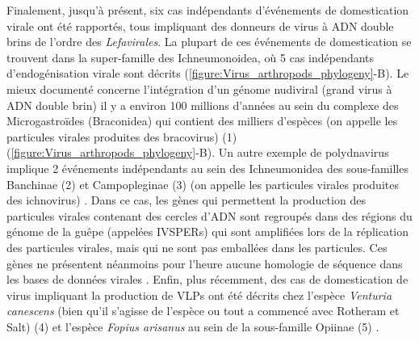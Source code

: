 Finalement, jusqu'à présent, six cas indépendants d'événements de domestication virale ont été rapportés, tous impliquant des donneurs de virus à ADN double brins de l'ordre des \textit{Lefavirales}. La plupart de ces événements de domestication se trouvent dans la super-famille des Ichneumonoidea, où 5 cas indépendants d'endogénisation virale sont décrits (\figurename{\ref{figure:Virus_arthropods_phylogeny}}-B). Le mieux documenté concerne l'intégration d'un génome nudiviral (grand virus à ADN double brin) il y a environ 100 millions d'années au sein du complexe des Microgastroïdes (Braconidea) qui contient des milliers d'espèces (on appelle les particules virales produites des bracovirus) (1) \citep{bezier_polydnaviruses_2009,whitfield_systematics_2018} (\figurename{\ref{figure:Virus_arthropods_phylogeny}}-B). Un autre exemple de polydnavirus implique 2 événements indépendants au sein des Ichneumonidea des sous-familles Banchinae (2) et Campopleginae (3) (on appelle les particules virales produites des ichnovirus) \citep{volkoff_analysis_2010,beliveau_genomic_2015}. Dans ce cas, les gènes qui permettent la production des particules virales contenant des cercles d'ADN sont regroupés dans des régions du génome de la guêpe (appelées IVSPERs) qui sont amplifiées lors de la réplication des particules virales, mais qui ne sont pas emballées dans les particules. Ces gènes ne présentent néanmoins pour l'heure aucune homologie de séquence dans les bases de données virales \citep{volkoff_analysis_2010}. Enfin, plus récemment, des cas de domestication de virus impliquant la production de VLPs ont été décrits chez l'espèce \textit{Venturia canescens} (bien qu'il s'agisse de l'espèce ou tout a commencé avec Rotheram et Salt) (4) \citep{pichon_recurrent_2015} et l'espèce \textit{Fopius arisanus} au sein de la sous-famille Opiinae (5) \citep{burke_rapid_2018}. \\

